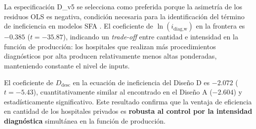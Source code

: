 \begin{table}[htbp]
\centering
\caption{Diseño D: comparación especificaciones v4 vs v5}
\label{tab:D_comp}
\small

\end{table}

La especificación D\_v5 se selecciona como preferida porque la asimetría de los residuos OLS es negativa, condición necesaria para la identificación del término de ineficiencia en modelos SFA \citep{kumbhakar2000stochastic}. El coeficiente de \(\ln(i_{\text{diag,w}})\) en la frontera es $-0.385$ ($t = -35.87$), indicando un \emph{trade-off} entre cantidad e intensidad en la función de producción: los hospitales que realizan más procedimientos diagnósticos por alta producen relativamente menos altas ponderadas, manteniendo constante el nivel de inputs.

El coeficiente de \(D_{\text{desc}}\) en la ecuación de ineficiencia del Diseño D es $-2.072$ ($t = -5.43$), cuantitativamente similar al encontrado en el Diseño A ($-2.604$) y estadísticamente significativo. Este resultado confirma que la ventaja de eficiencia en cantidad de los hospitales privados es \textbf{robusta al control por la intensidad diagnóstica} simultánea en la función de producción.
